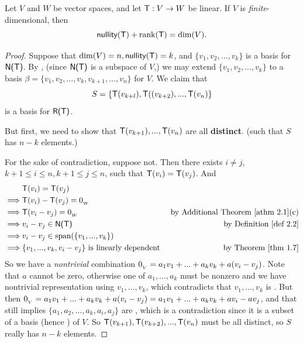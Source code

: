 \begin{theorem}  \label{thm 2.3}
Let \(V\) and \(W\) be vector spaces, and let \(\textsf{T} : V \to W\) be linear.
If \(V\) is \emph{finite}-dimensional, then
\[
    \textsf{nullity}(\textsf{T}) + \mathrm{rank}(\textsf{T}) = \dim(V).
\]
\end{theorem}

\begin{proof}
Suppose that \(\dim(V) = n, \textsf{nullity}(\textsf{T}) = k\), and \(\{ v_1, v_2, ..., v_k \}\) is a basis for \(\textsf{N(T)}\).
By , (since \(\textsf{N(T)}\) is a subspace of \(V\),) we may extend \(\{ v_1, v_2, ..., v_k \}\) to a basis \(\beta = \{ v_1, v_2, ..., v_k, v_{k +1}, ..., v_n \}\) for \(V\).
We claim that
\[
    S = \{ \textsf{T}(v_{k + l}), \textsf{T}((v_{k + 2}), ..., \textsf{T}(v_n) \}
\]
is a basis for \(\textsf{R(T)}\).

But first, we need to show that \(\textsf{T}(v_{k + 1}), ..., \textsf{T}(v_n)\) are all \textbf{distinct}. (such that \(S\) has \(n - k\) elements.)

For the sake of contradiction, suppose not.
Then there exists \(i \ne j\), \(k + 1 \le i \le n, k + 1 \le j \le n\), such that \(\textsf{T}(v_i) = \textsf{T}(v_j)\).
And
\begin{align*}
             & \T(v_i) = \T(v_j) \\
    \implies & \T(v_i) - \T(v_j) = \OW \\
    \implies & \T(v_i - v_j) = \OW & \text{by \ATHM{2.1}(c)} \\
    \implies & v_i - v_j \in \NULLT & \text{by \DEF{2.2}} \\
    \implies & v_i - v_j \in \spann(\{ v_1, ..., v_k \}) \\
    \implies & \{ v_1, ..., v_k, v_i - v_j \} \text{ is \LDP{} } & \text{by \THM{1.7}}
\end{align*}
So we have a \emph{nontrivial} combination \(0_{_V} = a_1 v_1 + ... + a_k v_k + a (v_i - v_j)\).
Note that \(a\) cannot be zero, otherwise one of \(a_1, ..., a_k\) must be nonzero and we have nontrivial representation using \(v_1, ..., v_k\), which contradicts that \(v_1, ..., v_k\) is \LID{}.
But then \(0_{_V} = a_1 v_1 + ... + a_k v_k + a (v_i - v_j) = a_1 v_1 + ... + a_k v_k + a v_i - a v_j\), and that still implies \(\{ a_1, a_2, ..., a_k, a_i, a_j \}\) are \LDP{}, which is a contradiction since it is a subset of a basis (hence \LID{}) of \(V\).
So \(\textsf{T}(v_{k + 1}), \textsf{T}(v_{k + 2}), ..., \textsf{T}(v_n)\) must be all distinct, so \(S\) really has \(n - k\) elements.


\end{proof}
